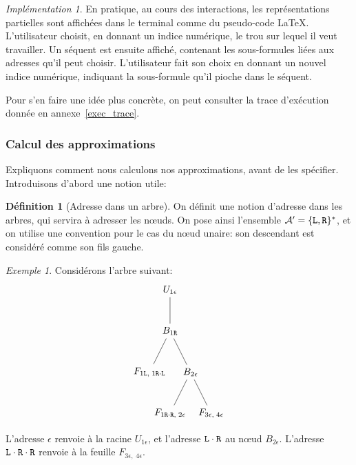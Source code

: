 \documentclass[11pt,a4paper]{article}
\theoremstyle{plain}
\theoremstyle{definition}
\newtheorem{definition}{Définition}
\theoremstyle{remark}
\newtheorem{example}{Exemple}
\newtheorem{implementation}{Implémentation}
\newcommand*{\Left}{\textnormal{\texttt{L}}}
\newcommand*{\Right}{\textnormal{\texttt{R}}}
\begin{document}
\begin{implementation}
    En pratique, au cours des interactions, les représentations partielles sont affichées dans le terminal comme du pseudo-code \LaTeX. L'utilisateur choisit, en donnant un indice numérique, le trou sur lequel il veut travailler. Un séquent est ensuite affiché, contenant les sous-formules liées aux adresses qu'il peut choisir. L'utilisateur fait son choix en donnant un nouvel indice numérique, indiquant la sous-formule qu'il pioche dans le séquent.

    Pour s'en faire une idée plus concrète, on peut consulter la trace d'exécution donnée en annexe~\ref{exec_trace}.
\end{implementation}

\subsubsection{Calcul des approximations}

Expliquons comment nous calculons nos approximations, avant de les spécifier. Introduisons d'abord une notion utile:

\begin{definition}[Adresse dans un arbre]
    On définit une notion d'adresse dans les arbres, qui servira à adresser les n\oe uds. On pose ainsi l'ensemble $\mathcal{A'} = \{ \Left, \Right\}^{*}$, et on utilise une convention pour le cas du n\oe ud unaire: son descendant est considéré comme son fils gauche.
\end{definition}

\begin{example} Considérons l'arbre suivant:
    \begin{equation*}
        \begin{tikzpicture}%
        [level 2/.style={sibling distance=5cm}
        level 3/.style={sibling distance=10cm}]
        \node {$U_{1 \epsilon}$}
        child {node {$B_{1 \Right}$}
            child {node {$F_{1 \Left, \; 1 \Right \cdot \Left}$}}
            child {
                node {$B_{2 \epsilon}$}
                child {node {$F_{1 \Right \cdot \Right, \; 2 \epsilon}$}}
                child {node {$F_{3 \epsilon, \; 4 \epsilon}$}}
        }};
        \end{tikzpicture}
    \end{equation*}

    L'adresse $\epsilon$ renvoie à la racine $U_{1 \epsilon}$, et l'adresse $\Left \cdot \Right$ au n\oe ud $B_{2 \epsilon}$. L'adresse $\Left \cdot \Right \cdot \Right$ renvoie à la feuille $F_{3 \epsilon, \; 4 \epsilon}$.
\end{example}
\end{document}
